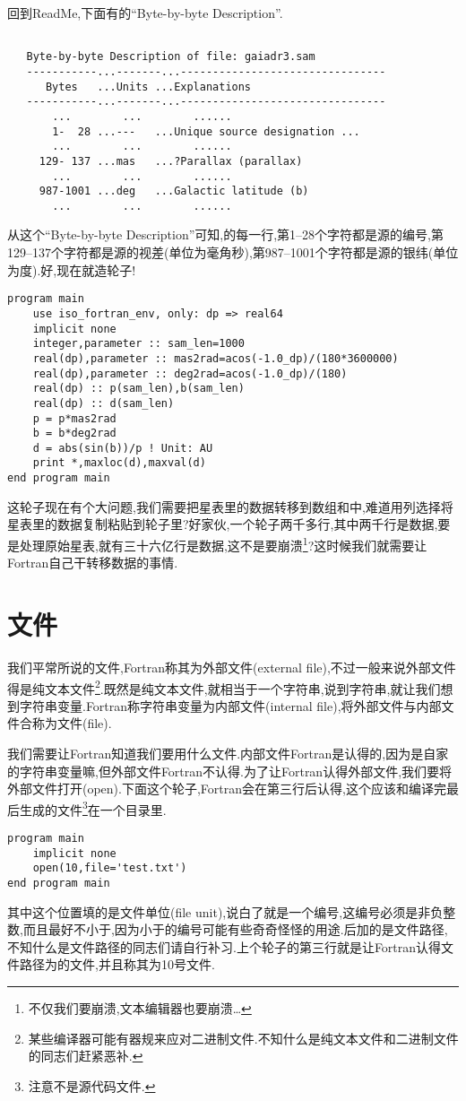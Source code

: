 回到ReadMe,下面有的``Byte-by-byte Description''.
\begin{lstlisting}

   Byte-by-byte Description of file: gaiadr3.sam
   -----------...-------...--------------------------------
      Bytes   ...Units ...Explanations
   -----------...-------...--------------------------------
       ...        ...        ......
       1-  28 ...---   ...Unique source designation ...
       ...        ...        ......
     129- 137 ...mas   ...?Parallax (parallax)
       ...        ...        ......
     987-1001 ...deg   ...Galactic latitude (b)
       ...        ...        ......
\end{lstlisting}
从这个``Byte-by-byte Description''可知,的每一行,第1--28个字符都是源的编号,第129--137个字符都是源的视差(单位为毫角秒),第987--1001个字符都是源的银纬(单位为度).好,现在就造轮子!\label{gaiadr3.sam}
\begin{lstlisting}
program main
    use iso_fortran_env, only: dp => real64
    implicit none
    integer,parameter :: sam_len=1000
    real(dp),parameter :: mas2rad=acos(-1.0_dp)/(180*3600000)
    real(dp),parameter :: deg2rad=acos(-1.0_dp)/(180)
    real(dp) :: p(sam_len),b(sam_len)
    real(dp) :: d(sam_len)
    p = p*mas2rad
    b = b*deg2rad
    d = abs(sin(b))/p ! Unit: AU
    print *,maxloc(d),maxval(d)
end program main
\end{lstlisting}
这轮子现在有个大问题,我们需要把星表里的数据转移到数组和中,难道用列选择将星表里的数据复制粘贴到轮子里?好家伙,一个轮子两千多行,其中两千行是数据,要是处理原始星表,就有三十六亿行是数据,这不是要崩溃\footnote{不仅我们要崩溃,文本编辑器也要崩溃\dots}?这时候我们就需要让Fortran自己干转移数据的事情.

\section{文件}

我们平常所说的文件,Fortran称其为外部文件(external file),不过一般来说外部文件得是纯文本文件\footnote{某些编译器可能有器规来应对二进制文件.不知什么是纯文本文件和二进制文件的同志们赶紧恶补.}.既然是纯文本文件,就相当于一个字符串,说到字符串,就让我们想到字符串变量.Fortran称字符串变量为内部文件(internal file),将外部文件与内部文件合称为文件(file).

我们需要让Fortran知道我们要用什么文件.内部文件Fortran是认得的,因为是自家的字符串变量嘛,但外部文件Fortran不认得.为了让Fortran认得外部文件,我们要将外部文件打开(open).下面这个轮子,Fortran会在第三行后认得,这个应该和编译完最后生成的文件\footnote{注意不是源代码文件.}在一个目录里.
\begin{lstlisting}
program main
    implicit none
    open(10,file='test.txt')
end program main
\end{lstlisting}
其中这个位置填的是文件单位(file unit),说白了就是一个编号,这编号必须是非负整数,而且最好不小于,因为小于的编号可能有些奇奇怪怪的用途.后加的是文件路径,不知什么是文件路径的同志们请自行补习.上个轮子的第三行就是让Fortran认得文件路径为的文件,并且称其为10号文件.

